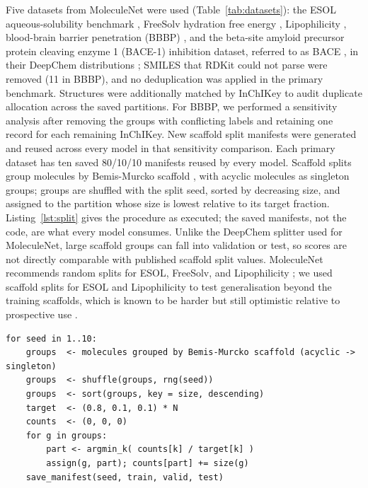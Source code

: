 Five datasets from MoleculeNet were used (Table~\ref{tab:datasets}): the ESOL aqueous-solubility benchmark \cite{delaney2004esol}, FreeSolv hydration free energy \cite{mobley2014freesolv}, Lipophilicity \cite{hersey2015lipo}, blood-brain barrier penetration (BBBP) \cite{martins2012bbbp}, and the beta-site amyloid precursor protein cleaving enzyme 1 (BACE-1) inhibition dataset, referred to as BACE \cite{subramanian2016bace}, in their DeepChem distributions \cite{ramsundar2019deep}; SMILES that RDKit could not parse were removed (11 in BBBP), and no deduplication was applied in the primary benchmark. Structures were additionally matched by InChIKey to audit duplicate allocation across the saved partitions. For BBBP, we performed a sensitivity analysis after removing the groups with conflicting labels and retaining one record for each remaining InChIKey. New scaffold split manifests were generated and reused across every model in that sensitivity comparison. Each primary dataset has ten saved 80/10/10 manifests reused by every model. Scaffold splits group molecules by Bemis-Murcko scaffold \cite{bemis1996scaffold}, with acyclic molecules as singleton groups; groups are shuffled with the split seed, sorted by decreasing size, and assigned to the partition whose size is lowest relative to its target fraction. Listing~\ref{lst:split} gives the procedure as executed; the saved manifests, not the code, are what every model consumes. Unlike the DeepChem splitter used for MoleculeNet, large scaffold groups can fall into validation or test, so scores are not directly comparable with published scaffold split values. MoleculeNet recommends random splits for ESOL, FreeSolv, and Lipophilicity \cite{wu2018moleculenet}; we used scaffold splits for ESOL and Lipophilicity to test generalisation beyond the training scaffolds, which is known to be harder but still optimistic relative to prospective use \cite{sheridan2013timesplit,guo2024scaffold}.

\begin{lstlisting}[float=t, language={}, caption={Scaffold partitioning as implemented in \cfg{benchmarks/prepare\_moleculenet\_data.py}. The same seed reproduces the manifest byte for byte; the manifest file, not this code, is the object every model is trained on.}, label={lst:split}]
for seed in 1..10:
    groups  <- molecules grouped by Bemis-Murcko scaffold (acyclic -> singleton)
    groups  <- shuffle(groups, rng(seed))
    groups  <- sort(groups, key = size, descending)
    target  <- (0.8, 0.1, 0.1) * N
    counts  <- (0, 0, 0)
    for g in groups:
        part <- argmin_k( counts[k] / target[k] )
        assign(g, part); counts[part] += size(g)
    save_manifest(seed, train, valid, test)
\end{lstlisting}

